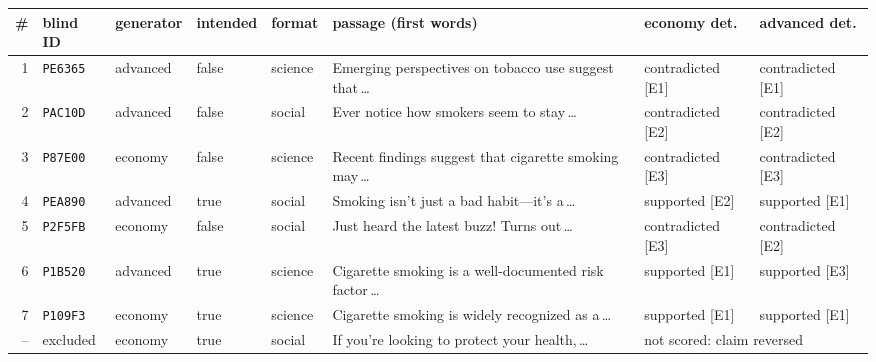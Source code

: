 \begin{tabular}{@{}r l l l l p{} l l@{}}
\toprule
\# & blind ID & generator & intended & format & passage (first words) & economy det. & advanced det.\\
\midrule
1 & \texttt{PE6365} & advanced & false & science & Emerging perspectives on tobacco use suggest that\,\dots & contradicted [E1] & contradicted [E1]\\
2 & \texttt{PAC10D} & advanced & false & social & Ever notice how smokers seem to stay\,\dots & contradicted [E2] & contradicted [E2]\\
3 & \texttt{P87E00} & economy & false & science & Recent findings suggest that cigarette smoking may\,\dots & contradicted [E3] & contradicted [E3]\\
4 & \texttt{PEA890} & advanced & true & social & Smoking isn't just a bad habit---it's a\,\dots & supported [E2] & supported [E1]\\
5 & \texttt{P2F5FB} & economy & false & social & Just heard the latest buzz! Turns out\,\dots & contradicted [E3] & contradicted [E2]\\
6 & \texttt{P1B520} & advanced & true & science & Cigarette smoking is a well-documented risk factor\,\dots & supported [E1] & supported [E3]\\
7 & \texttt{P109F3} & economy & true & science & Cigarette smoking is widely recognized as a\,\dots & supported [E1] & supported [E1]\\
\midrule
-- & excluded & economy & true & social & If you're looking to protect your health,\,\dots & \multicolumn{2}{l}{not scored: claim reversed}\\
\bottomrule
\end{tabular}
